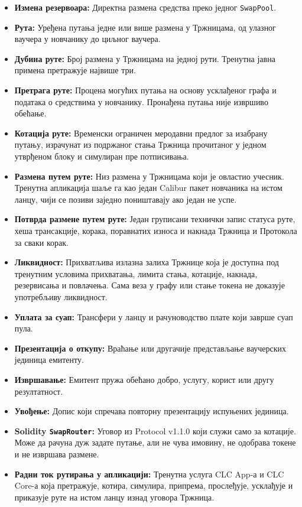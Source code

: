 \documentclass[11pt]{article}
\begin{document}
\begin{itemize}[leftmargin=*]
\item \textbf{Измена резервоара:} Директна размена средства преко једног \texttt{SwapPool}.
\item \textbf{Рута:} Уређена путања једне или више размена у Тржницама, од улазног ваучера у новчанику до циљног ваучера.
\item \textbf{Дубина руте:} Број размена у Тржницама на једној рути. Тренутна јавна примена претражује највише три.
\item \textbf{Претрага руте:} Процена могућих путања на основу усклађеног графа и података о средствима у новчанику. Пронађена путања није извршиво обећање.
\item \textbf{Котација руте:} Временски ограничен меродавни предлог за изабрану путању, израчунат из подржаног стања Тржница прочитаног у једном утврђеном блоку и симулиран пре потписивања.
\item \textbf{Размена путем руте:} Низ размена у Тржницама који је овластио учесник. Тренутна апликација шаље га као један Calibur пакет новчаника на истом ланцу, чији се позиви заједно поништавају ако један не успе.
\item \textbf{Потврда размене путем руте:} Један груписани технички запис статуса руте, хеша трансакције, корака, поравнатих износа и накнада Тржница и Протокола за сваки корак.
\item \textbf{Ликвидност:} Прихватљива излазна залиха Тржнице која је доступна под тренутним условима прихватања, лимита стања, котације, накнада, резервисања и повлачења. Сама веза у графу или стање токена не доказује употребљиву ликвидност.
\item \textbf{Уплата за суап:} Трансфери у ланцу и рачуноводство плате који заврше суап пула.
\item \textbf{Презентација о откупу:} Враћање или другачије представљање ваучерских јединица емитенту.
\item \textbf{Извршавање:} Емитент пружа обећано добро, услугу, корист или другу резултатност.
\item \textbf{Увођење:} Допис који спречава повторну презентацију испуњених јединица.
\item \textbf{Solidity \texttt{SwapRouter}:} Уговор из Protocol v1.1.0 који служи само за котације. Може да рачуна дуж задате путање, али не чува имовину, не одобрава токене и не извршава размене.
\item \textbf{Радни ток рутирања у апликацији:} Тренутна услуга CLC App-а и CLC Core-а која претражује, котира, симулира, припрема, прослеђује, усклађује и приказује руте на истом ланцу изнад уговора Тржница.

\end{itemize}
\end{document}

